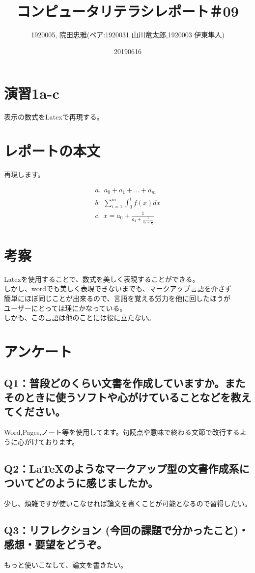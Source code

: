 \documentclass[11pt,a4j]{jarticle}
\title{コンピュータリテラシレポート＃09}
\author{1920005, 院田忠雅(ペア:1920031 山川竜太郎,1920003 伊東隼人)}
\date{20190616}
\begin{document}
\maketitle


\section{演習1a-c}
表示の数式をLatexで再現する。 

\section{レポートの本文}
再現します。
\begin{center}
  \begin{eqnarray*}
   a.  \, \, \,a_0+a_1+...+a_m\\
   b.  \,  \, \,\sum_{i=1}^m \int_0^i f(x)dx\\
　c. \, \, \,x = a_0+\frac{1}{a_1+\frac{1}{a_2+\frac{1}{a_3}}} 
  \end{eqnarray*}
\end{center}

\section{考察}
Latexを使用することで、数式を美しく表現することができる。\\
しかし、wordでも美しく表現できないまでも、マークアップ言語を介さず\\
簡単にほぼ同じことが出来るので、言語を覚える労力を他に回したほうが\\
ユーザーにとっては理にかなっている。\\
しかも、この言語は他のことには役に立たない。

\section{アンケート}

\subsection{Q1：普段どのくらい文書を作成していますか。またそのときに使うソフトや心がけていることなどを教えてください。}
Word,Pages,ノート等を使用してます。句読点や意味で終わる文節で改行するように心がけております。

\subsection{Q2：LaTeXのようなマークアップ型の文書作成系についてどのように感じましたか。}
少し、煩雑ですが使いこなせれば論文を書くことが可能となるので習得したい。

\subsection{Q3：リフレクション (今回の課題で分かったこと)・感想・要望をどうぞ。}
もっと使いこなして、論文を書きたい。
\end{document}
